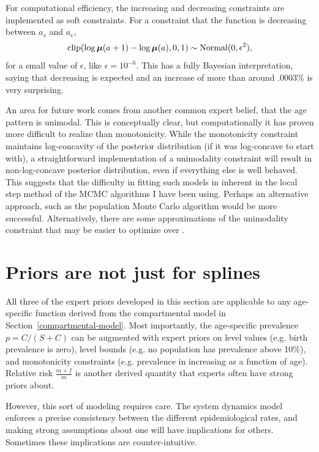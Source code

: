 For computational efficiency, the increasing and decreasing
constraints are implemented as soft constraints.  For a constraint
that the function is decreasing between $a_s$ and $a_e$,
\[
\operatorname{clip}(\log \boldsymbol{\mu}(a+1) - \log \boldsymbol{\mu}(a), 0, 1) \sim \operatorname{Normal}(0, \epsilon^2),
\]
for a small value of $\epsilon$, like $\epsilon = 10^{-6}$.  This has
a fully Bayesian interpretation, saying that decreasing is expected
and an increase of more than around .0003\% is very surprising.


An area for future work comes from another common expert belief, that
the age pattern is unimodal.  This is conceptually clear, but
computationally it has proven more difficult to realize than
monotonicity.  While the monotonicity constraint maintains
log-concavity of the posterior distribution (if it was log-concave to
start with), a straightforward implementation of a unimodality
constraint will result in non-log-concave posterior distribution, even
if everything else is well behaved.  This suggests that the difficulty
in fitting such models in inherent in the local step method of the
MCMC algorithms I have been using.  Perhaps an alternative approach,
such as the population Monte Carlo algorithm would be more successful.
Alternatively, there are some approximations of the unimodality
constraint that may be easier to optimize over \cite{Papp[KP6]]}.

\section{Priors are not just for splines}
All three of the expert priors developed in this section are
applicable to any age-specific function derived from the compartmental
model in Section~\ref{compartmental-model}. Most importantly, the
age-specific prevalence $p = C/(S+C)$ can be augmented with expert
priors on level values (e.g. birth prevalence is zero), level bounds
(e.g. no population has prevalence above 10\%), and monotonicity
constraints (e.g. prevalence in increasing as a function of
age). Relative risk $\frac{m+f}{m}$ is another derived quantity that
experts often have strong priors about.

However, this sort of modeling requires care. The system dynamics
model enforces a precise consistency between the different
epidemiological rates, and making strong assumptions about one will
have implications for others.  Sometimes these implications are
counter-intuitive.

